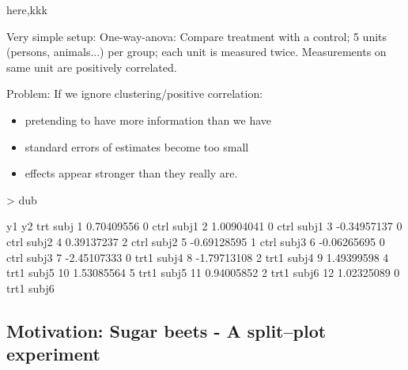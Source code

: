 \begin{frame}
  {here,kkk}

  
  Very simple setup: One-way-anova: Compare treatment with a control; 5
units (persons, animals...) per group; each unit is measured
twice. Measurements on same unit are positively correlated.

Problem: If we ignore  clustering/positive correlation:
\begin{itemize}
\item pretending to have
  more information than we have
  
\item standard errors of estimates become
  too small 
\item effects appear stronger than they really are.
\end{itemize}


\begin{Schunk}
\begin{Sinput}
> dub
\end{Sinput}
\begin{Soutput}
            y1 y2  trt  subj
1   0.70409556  0 ctrl subj1
2   1.00904041  0 ctrl subj1
3  -0.34957137  0 ctrl subj2
4   0.39137237  2 ctrl subj2
5  -0.69128595  1 ctrl subj3
6  -0.06265695  0 ctrl subj3
7  -2.45107333  0 trt1 subj4
8  -1.79713108  2 trt1 subj4
9   1.49399598  4 trt1 subj5
10  1.53085564  5 trt1 subj5
11  0.94005852  2 trt1 subj6
12  1.02325089  0 trt1 subj6
\end{Soutput}
\end{Schunk}



\end{frame}








\subsection{Motivation: Sugar beets - A split--plot experiment}
\label{sec:xxx}

